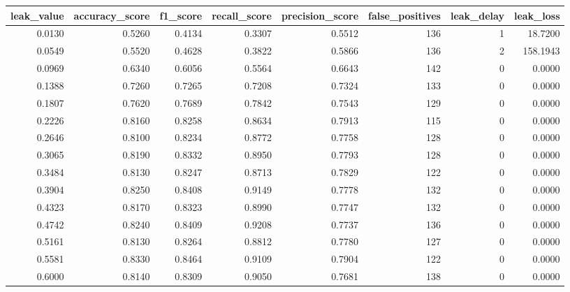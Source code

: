 \begin{tabular}{rrrrrrrr}
\toprule
leak\_value & accuracy\_score & f1\_score & recall\_score & precision\_score & false\_positives & leak\_delay & leak\_loss \\
\midrule
0.0130 & 0.5260 & 0.4134 & 0.3307 & 0.5512 & 136 & 1 & 18.7200 \\
0.0549 & 0.5520 & 0.4628 & 0.3822 & 0.5866 & 136 & 2 & 158.1943 \\
0.0969 & 0.6340 & 0.6056 & 0.5564 & 0.6643 & 142 & 0 & 0.0000 \\
0.1388 & 0.7260 & 0.7265 & 0.7208 & 0.7324 & 133 & 0 & 0.0000 \\
0.1807 & 0.7620 & 0.7689 & 0.7842 & 0.7543 & 129 & 0 & 0.0000 \\
0.2226 & 0.8160 & 0.8258 & 0.8634 & 0.7913 & 115 & 0 & 0.0000 \\
0.2646 & 0.8100 & 0.8234 & 0.8772 & 0.7758 & 128 & 0 & 0.0000 \\
0.3065 & 0.8190 & 0.8332 & 0.8950 & 0.7793 & 128 & 0 & 0.0000 \\
0.3484 & 0.8130 & 0.8247 & 0.8713 & 0.7829 & 122 & 0 & 0.0000 \\
0.3904 & 0.8250 & 0.8408 & 0.9149 & 0.7778 & 132 & 0 & 0.0000 \\
0.4323 & 0.8170 & 0.8323 & 0.8990 & 0.7747 & 132 & 0 & 0.0000 \\
0.4742 & 0.8240 & 0.8409 & 0.9208 & 0.7737 & 136 & 0 & 0.0000 \\
0.5161 & 0.8130 & 0.8264 & 0.8812 & 0.7780 & 127 & 0 & 0.0000 \\
0.5581 & 0.8330 & 0.8464 & 0.9109 & 0.7904 & 122 & 0 & 0.0000 \\
0.6000 & 0.8140 & 0.8309 & 0.9050 & 0.7681 & 138 & 0 & 0.0000 \\
\bottomrule
\end{tabular}
